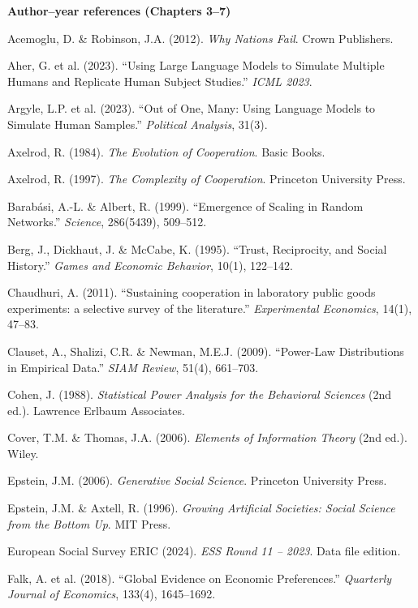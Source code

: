 {\textbf{Author--year references (Chapters 3--7)}\par\smallskip

Acemoglu, D. \& Robinson, J.A. (2012). \textit{Why Nations Fail}. Crown Publishers.\par\smallskip
Aher, G. et al. (2023). ``Using Large Language Models to Simulate Multiple Humans and Replicate Human Subject Studies.'' \textit{ICML 2023}.\par\smallskip
Argyle, L.P. et al. (2023). ``Out of One, Many: Using Language Models to Simulate Human Samples.'' \textit{Political Analysis}, 31(3).\par\smallskip
Axelrod, R. (1984). \textit{The Evolution of Cooperation}. Basic Books.\par\smallskip
Axelrod, R. (1997). \textit{The Complexity of Cooperation}. Princeton University Press.\par\smallskip
Barabási, A.-L. \& Albert, R. (1999). ``Emergence of Scaling in Random Networks.'' \textit{Science}, 286(5439), 509--512.\par\smallskip
Berg, J., Dickhaut, J. \& McCabe, K. (1995). ``Trust, Reciprocity, and Social History.'' \textit{Games and Economic Behavior}, 10(1), 122--142.\par\smallskip
Chaudhuri, A. (2011). ``Sustaining cooperation in laboratory public goods experiments: a selective survey of the literature.'' \textit{Experimental Economics}, 14(1), 47--83.\par\smallskip
Clauset, A., Shalizi, C.R. \& Newman, M.E.J. (2009). ``Power-Law Distributions in Empirical Data.'' \textit{SIAM Review}, 51(4), 661--703.\par\smallskip
Cohen, J. (1988). \textit{Statistical Power Analysis for the Behavioral Sciences} (2nd ed.). Lawrence Erlbaum Associates.\par\smallskip
Cover, T.M. \& Thomas, J.A. (2006). \textit{Elements of Information Theory} (2nd ed.). Wiley.\par\smallskip
Epstein, J.M. (2006). \textit{Generative Social Science}. Princeton University Press.\par\smallskip
Epstein, J.M. \& Axtell, R. (1996). \textit{Growing Artificial Societies: Social Science from the Bottom Up}. MIT Press.\par\smallskip
European Social Survey ERIC (2024). \textit{ESS Round 11 -- 2023}. Data file edition.\par\smallskip
Falk, A. et al. (2018). ``Global Evidence on Economic Preferences.'' \textit{Quarterly Journal of Economics}, 133(4), 1645--1692.\par\smallskip
}
